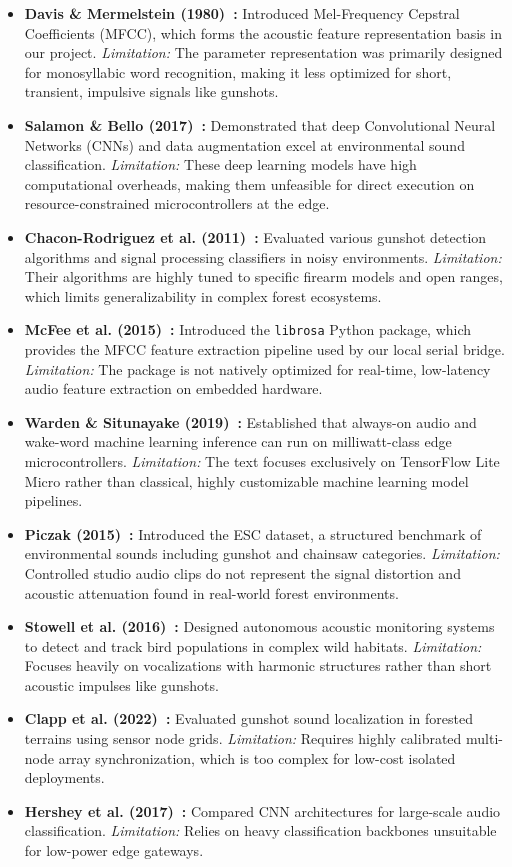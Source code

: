 \documentclass[11pt,a4paper,oneside]{report}
\begin{document}
\begin{itemize}
    \item \textbf{Davis \& Mermelstein (1980)~\cite{ref_davis}:} Introduced Mel-Frequency Cepstral Coefficients (MFCC), which forms the acoustic feature representation basis in our project. \emph{Limitation:} The parameter representation was primarily designed for monosyllabic word recognition, making it less optimized for short, transient, impulsive signals like gunshots.
    \item \textbf{Salamon \& Bello (2017)~\cite{ref_salamon}:} Demonstrated that deep Convolutional Neural Networks (CNNs) and data augmentation excel at environmental sound classification. \emph{Limitation:} These deep learning models have high computational overheads, making them unfeasible for direct execution on resource-constrained microcontrollers at the edge.
    \item \textbf{Chacon-Rodriguez et al. (2011)~\cite{ref_chacon}:} Evaluated various gunshot detection algorithms and signal processing classifiers in noisy environments. \emph{Limitation:} Their algorithms are highly tuned to specific firearm models and open ranges, which limits generalizability in complex forest ecosystems.
    \item \textbf{McFee et al. (2015)~\cite{ref_mcfee}:} Introduced the \texttt{librosa} Python package, which provides the MFCC feature extraction pipeline used by our local serial bridge. \emph{Limitation:} The package is not natively optimized for real-time, low-latency audio feature extraction on embedded hardware.
    \item \textbf{Warden \& Situnayake (2019)~\cite{ref_warden}:} Established that always-on audio and wake-word machine learning inference can run on milliwatt-class edge microcontrollers. \emph{Limitation:} The text focuses exclusively on TensorFlow Lite Micro rather than classical, highly customizable machine learning model pipelines.
    \item \textbf{Piczak (2015)~\cite{ref_piczak}:} Introduced the ESC dataset, a structured benchmark of environmental sounds including gunshot and chainsaw categories. \emph{Limitation:} Controlled studio audio clips do not represent the signal distortion and acoustic attenuation found in real-world forest environments.
    \item \textbf{Stowell et al. (2016)~\cite{ref_stowell}:} Designed autonomous acoustic monitoring systems to detect and track bird populations in complex wild habitats. \emph{Limitation:} Focuses heavily on vocalizations with harmonic structures rather than short acoustic impulses like gunshots.
    \item \textbf{Clapp et al. (2022)~\cite{ref_clapp}:} Evaluated gunshot sound localization in forested terrains using sensor node grids. \emph{Limitation:} Requires highly calibrated multi-node array synchronization, which is too complex for low-cost isolated deployments.
    \item \textbf{Hershey et al. (2017)~\cite{ref_hershey}:} Compared CNN architectures for large-scale audio classification. \emph{Limitation:} Relies on heavy classification backbones unsuitable for low-power edge gateways.
\end{itemize}
\end{document}

